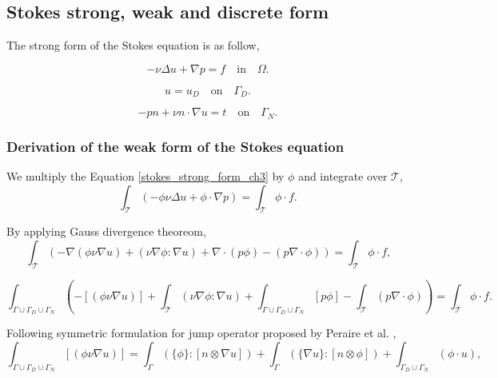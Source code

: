 \documentclass[a4paper,twoside,openright]{book}
\begin{document}
\subsection{Stokes strong, weak and discrete form} \label{Stokes_flow_ch3}

The strong form of the Stokes equation is as follow,

\begin{equation} \label{stokes_strong_form_ch3}
-\nu \Delta u + \nabla p = f \quad \textrm{in} \quad \Omega \textrm{.}
\end{equation}

\begin{equation} \label{dirichlet condition stokes_ch3}
u = u_D \quad \textrm{on} \quad \Gamma_D \textrm{.}
\end{equation}

\begin{equation} \label{neumann condition stokes_ch3}
-pn + \nu n \cdot \nabla u = t \quad \textrm{on} \quad \Gamma_N \textrm{.}
\end{equation}


\subsubsection{Derivation of the weak form of the Stokes equation} \label{derivation_weak_stokes}

We multiply the Equation \ref{stokes_strong_form_ch3} by $\phi$ and integrate over $\mathcal{T}$,
\begin{equation}
\int_{\mathcal{T}} (- \phi \nu \Delta u + \phi \cdot \nabla p) = \int_{\mathcal{T}} \phi \cdot f \textrm{.}
\end{equation}

By applying Gauss divergence theoreom,
\begin{equation}
\int_{\mathcal{T}} (-\nabla (\phi \nu \nabla u) + (\nu \nabla \phi : \nabla u) + \nabla \cdot (p \phi) - (p \nabla \cdot \phi)) = \int_{\mathcal{T}} \phi \cdot f \textrm{,}
\end{equation}

\begin{equation}
\int_{\Gamma \cup \Gamma_D \cup \Gamma_N} (- [(\phi \nu \nabla u)] + \int_{\mathcal{T}}  (\nu \nabla \phi : \nabla u) + \int_{\Gamma \cup \Gamma_D \cup \Gamma_N}  [p \phi] - \int_{\mathcal{T}}  (p \nabla \cdot \phi)) = \int_{\mathcal{T}} \phi \cdot f \textrm{.}
\end{equation}

Following symmetric formulation for jump operator proposed by Peraire et al. \cite{peraire},
\begin{equation}
\int_{\Gamma \cup \Gamma_D \cup \Gamma_N} [(\phi \nu \nabla u)] = \int_{\Gamma} (\lbrace \phi \rbrace : [n \otimes \nabla u]) + \int_{\Gamma} (\lbrace \nabla u \rbrace : [n \otimes \phi]) + \int_{\Gamma_D \cup \Gamma_N} (\phi \cdot u ) \textrm{,}
\end{equation}
\end{document}
